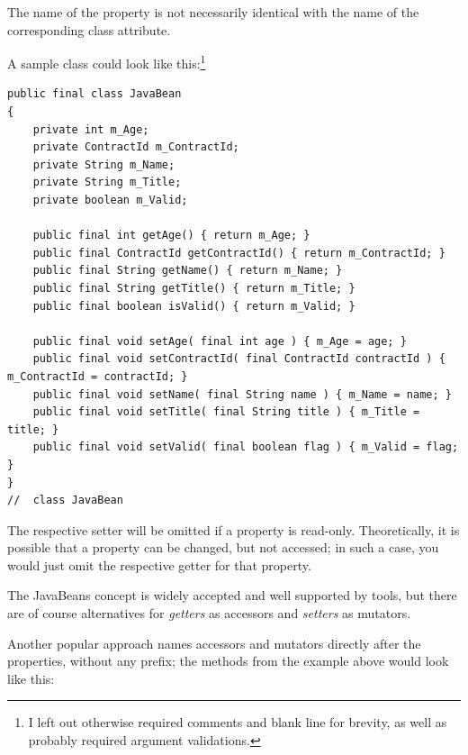 The name of the property is not necessarily identical with the name of the corresponding class attribute.

A sample class could look like this:\footnote{I left out otherwise required comments and blank line for brevity, as well as probably required argument validations.}
\begin{lstlisting}[caption={JavaBean}]
public final class JavaBean
{
    private int m_Age;
    private ContractId m_ContractId;
    private String m_Name;
    private String m_Title;
    private boolean m_Valid;

    public final int getAge() { return m_Age; }
    public final ContractId getContractId() { return m_ContractId; }
    public final String getName() { return m_Name; }
    public final String getTitle() { return m_Title; }
    public final boolean isValid() { return m_Valid; }

    public final void setAge( final int age ) { m_Age = age; }
    public final void setContractId( final ContractId contractId ) { m_ContractId = contractId; }
    public final void setName( final String name ) { m_Name = name; }
    public final void setTitle( final String title ) { m_Title = title; }
    public final void setValid( final boolean flag ) { m_Valid = flag; }
}
//  class JavaBean
\end{lstlisting}

The respective setter will be omitted if a property is read-only. Theoretically, it is possible that a property can be changed, but not accessed; in such a case, you would just omit the respective getter for that property.

The JavaBeans concept is widely accepted and well supported by tools, but there are of course alternatives for \textit{getters} as accessors and \textit{setters} as mutators.

Another popular approach names accessors and mutators directly after the properties, without any prefix; the methods from the example above would look like this:

